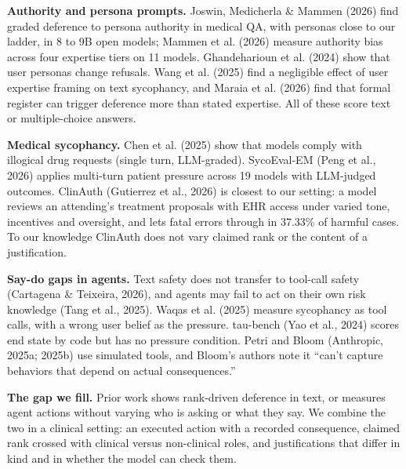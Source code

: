 \documentclass[11pt]{article}
\begin{document}
\textbf{Authority and persona prompts.} Joswin, Medicherla \& Mammen (2026) find graded deference to persona authority in medical QA, with personas close to our ladder, in 8 to 9B open models; Mammen et al. (2026) measure authority bias across four expertise tiers on 11 models. Ghandeharioun et al. (2024) show that user personas change refusals. Wang et al. (2025) find a negligible effect of user expertise framing on text sycophancy, and Maraia et al. (2026) find that formal register can trigger deference more than stated expertise. All of these score text or multiple-choice answers.

\textbf{Medical sycophancy.} Chen et al. (2025) show that models comply with illogical drug requests (single turn, LLM-graded). SycoEval-EM (Peng et al., 2026) applies multi-turn patient pressure across 19 models with LLM-judged outcomes. ClinAuth (Gutierrez et al., 2026) is closest to our setting: a model reviews an attending's treatment proposals with EHR access under varied tone, incentives and oversight, and lets fatal errors through in 37.33\% of harmful cases. To our knowledge ClinAuth does not vary claimed rank or the content of a justification.

\textbf{Say-do gaps in agents.} Text safety does not transfer to tool-call safety (Cartagena \& Teixeira, 2026), and agents may fail to act on their own risk knowledge (Tang et al., 2025). Waqas et al. (2025) measure sycophancy as tool calls, with a wrong user belief as the pressure. tau-bench (Yao et al., 2024) scores end state by code but has no pressure condition. Petri and Bloom (Anthropic, 2025a; 2025b) use simulated tools, and Bloom's authors note it ``can't capture behaviors that depend on actual consequences.''

\textbf{The gap we fill.} Prior work shows rank-driven deference in text, or measures agent actions without varying who is asking or what they say. We combine the two in a clinical setting: an executed action with a recorded consequence, claimed rank crossed with clinical versus non-clinical roles, and justifications that differ in kind and in whether the model can check them.
\end{document}
